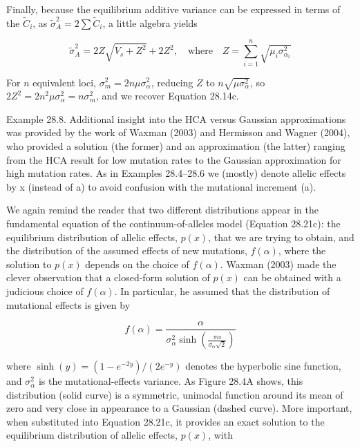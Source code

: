 \documentclass{article}
\begin{document}
Finally, because the equilibrium additive variance can be expressed in terms of the  $ \widetilde{C}_i $, as  $ \widetilde{\sigma}_A^2 = 2 \sum \widetilde{C}_i $, a little algebra yields

\begin{equation}
\widetilde{\sigma}_{A}^{2}=2Z\sqrt{V_{s}+Z^{2}}+2Z^{2},\quad\mathrm{w h e r e}\quad Z=\sum_{i=1}^{n}\sqrt{\mu_{i}\sigma_{\alpha_{i}}^{2}}
\tag{28.28f}
\label{eq:28_28f}
\end{equation}

For $n$ equivalent loci, $\sigma_m^2 = 2n\mu\sigma_\alpha^2$, reducing $Z$ to $n\sqrt{\mu\sigma_\alpha^2}$, so $2Z^2 = 2n^2\mu\sigma_\alpha^2 = n\sigma_m^2$, and we recover Equation 28.14c.

Example 28.8. Additional insight into the HCA versus Gaussian approximations was provided by the work of Waxman (2003) and Hermisson and Wagner (2004), who provided a solution (the former) and an approximation (the latter) ranging from the HCA result for low mutation rates to the Gaussian approximation for high mutation rates. As in Examples 28.4–28.6 we (mostly) denote allelic effects by x (instead of a) to avoid confusion with the mutational increment (a).

We again remind the reader that two different distributions appear in the fundamental equation of the continuum-of-alleles model (Equation 28.21c): the equilibrium distribution of allelic effects,  $ p(x) $, that we are trying to obtain, and the distribution of the assumed effects of new mutations,  $ f(\alpha) $, where the solution to  $ p(x) $ depends on the choice of  $ f(\alpha) $. Waxman (2003) made the clever observation that a closed-form solution of  $ p(x) $ can be obtained with a judicious choice of  $ f(\alpha) $. In particular, he assumed that the distribution of mutational effects is given by

\begin{equation}
f(\alpha)=\frac{\alpha}{\sigma_{\alpha}^{2}\sinh\left(\frac{\pi\alpha}{\sigma_{\alpha}\sqrt{2}}\right)}
\tag{28.29a}
\label{eq:28_29a}
\end{equation}

where  $ \sinh(y) = (1 - e^{-2y})/(2e^{-y}) $ denotes the hyperbolic sine function, and  $ \sigma_\alpha^2 $ is the mutational-effects variance. As Figure 28.4A shows, this distribution (solid curve) is a symmetric, unimodal function around its mean of zero and very close in appearance to a Gaussian (dashed curve). More important, when substituted into Equation 28.21c, it provides an exact solution to the equilibrium distribution of allelic effects,  $ p(x) $, with
\end{document}
